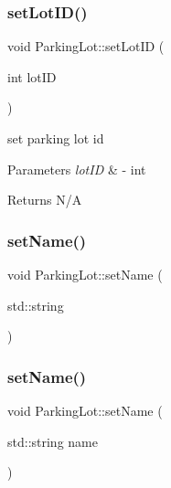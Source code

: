 \mbox{\label{class_parking_lot_a10ff48e3483395f5fa7fd15a80913515}} 
\subsubsection{\texorpdfstring{set\+Lot\+I\+D()}{setLotID()}\hspace{0.1cm}{\footnotesize\ttfamily [2/2]}}
{\footnotesize\ttfamily void Parking\+Lot\+::set\+Lot\+ID (\begin{DoxyParamCaption}\item[{int}]{lot\+ID }\end{DoxyParamCaption})}



set parking lot id 


\begin{DoxyParams}{Parameters}
{\em lot\+ID} & -\/ int \\
\hline
\end{DoxyParams}
\begin{DoxyReturn}{Returns}
N/A 
\end{DoxyReturn}
\mbox{\label{class_parking_lot_af51fbe3b4f7aa25f69f44277d7e9394c}} 
\subsubsection{\texorpdfstring{set\+Name()}{setName()}\hspace{0.1cm}{\footnotesize\ttfamily [1/2]}}
{\footnotesize\ttfamily void Parking\+Lot\+::set\+Name (\begin{DoxyParamCaption}\item[{std\+::string}]{ }\end{DoxyParamCaption})}

\mbox{\label{class_parking_lot_af51fbe3b4f7aa25f69f44277d7e9394c}} 
\subsubsection{\texorpdfstring{set\+Name()}{setName()}\hspace{0.1cm}{\footnotesize\ttfamily [2/2]}}
{\footnotesize\ttfamily void Parking\+Lot\+::set\+Name (\begin{DoxyParamCaption}\item[{std\+::string}]{name }\end{DoxyParamCaption})}



